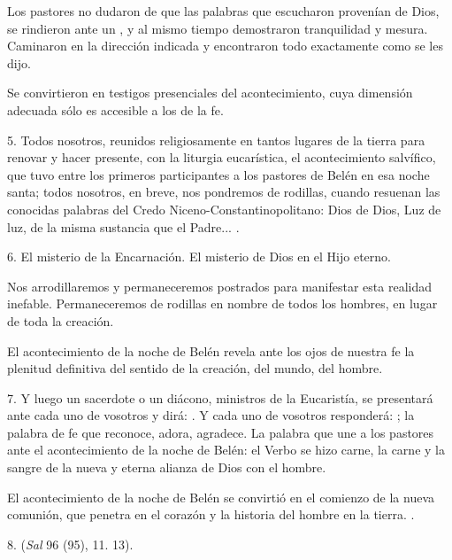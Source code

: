\begin{body}
\begin{body}
		Los pastores no dudaron de que las palabras que escucharon provenían de Dios, se rindieron ante un , y al mismo tiempo demostraron tranquilidad y mesura. Caminaron en la dirección indicada y encontraron todo exactamente como se les dijo.
		
		Se convirtieron en testigos presenciales del acontecimiento, cuya dimensión adecuada sólo es accesible a los  de la fe.
		
		5. Todos nosotros, reunidos religiosamente en tantos lugares de la tierra para renovar y hacer presente, con la liturgia eucarística, el acontecimiento salvífico, que tuvo entre los primeros participantes a los pastores de Belén en esa noche santa; todos nosotros, en breve, nos pondremos de rodillas, cuando resuenan las conocidas palabras del Credo Niceno-Constantinopolitano: Dios de Dios, Luz de luz, de la misma sustancia que el Padre... .
		
		6. El misterio de la Encarnación. El misterio de Dios  en el Hijo eterno.
		
		Nos arrodillaremos y permaneceremos postrados para manifestar esta realidad inefable. Permaneceremos de rodillas en nombre de todos los hombres, en lugar de toda la creación.
		
		El acontecimiento de la noche de Belén revela ante los ojos de nuestra fe la plenitud definitiva del sentido de la creación, del mundo, del hombre.
		
		7. Y luego un sacerdote o un diácono, ministros de la Eucaristía, se presentará ante cada uno de vosotros y dirá: . Y cada uno de vosotros responderá: ; la palabra de fe que reconoce, adora, agradece. La palabra que une a los pastores ante el acontecimiento de la noche de Belén: el Verbo se hizo carne, la carne y la sangre de la nueva y eterna alianza de Dios con el hombre.
		
		El acontecimiento de la noche de Belén se convirtió en el comienzo de la nueva comunión, que penetra en el corazón y la historia del hombre en la tierra. .
		
		8.  (\emph{Sal} 96 (95), 11. 13).
		

\end{body}
\end{body}
